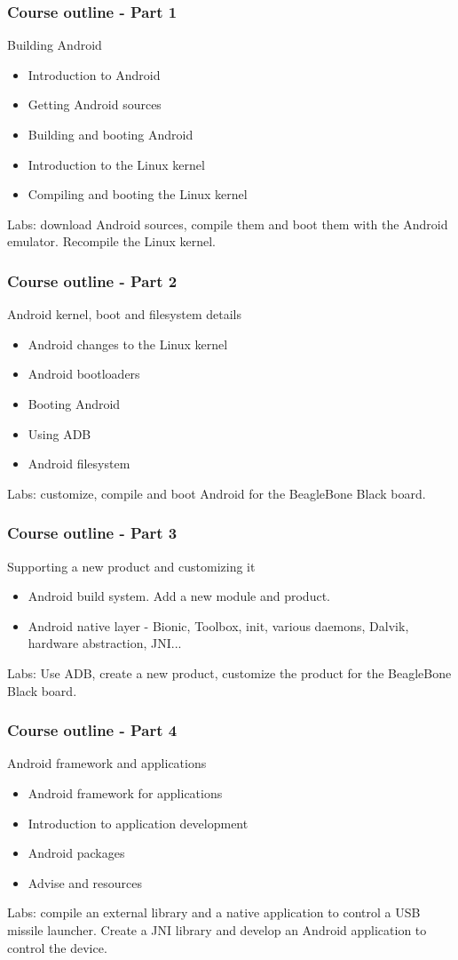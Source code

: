 \begin{frame}
\frametitle{Course outline - Part 1}
Building Android
\begin{itemize}
\item Introduction to Android
\item Getting Android sources
\item Building and booting Android
\item Introduction to the Linux kernel
\item Compiling and booting the Linux kernel
\end{itemize}
Labs: download Android sources, compile them and boot them with the
Android emulator. Recompile the Linux kernel.
\end{frame}

\begin{frame}
\frametitle{Course outline - Part 2}
Android kernel, boot and filesystem details
\begin{itemize}
\item Android changes to the Linux kernel
\item Android bootloaders
\item Booting Android
\item Using ADB
\item Android filesystem
\end{itemize}
Labs: customize, compile and boot Android for the BeagleBone Black board.
\end{frame}

\begin{frame}
\frametitle{Course outline - Part 3}
Supporting a new product and customizing it
\begin{itemize}
\item Android build system. Add a new module and product.
\item Android native layer - Bionic, Toolbox, init, various daemons,
Dalvik, hardware abstraction, JNI...
\end{itemize}
Labs: Use ADB, create a new product, customize the product for the
BeagleBone Black board.
\end{frame}

\begin{frame}
\frametitle{Course outline - Part 4}
Android framework and applications
\begin{itemize}
\item Android framework for applications
\item Introduction to application development
\item Android packages
\item Advise and resources
\end{itemize}
Labs: compile an external library and a native application to control a
USB missile launcher. Create a JNI library and develop an Android
application to control the device.
\end{frame}
